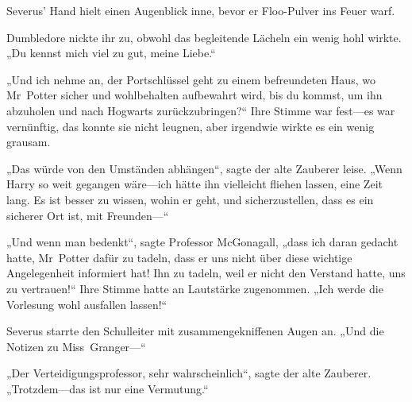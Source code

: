 Severus' Hand hielt einen Augenblick inne, bevor er Floo-Pulver ins Feuer warf.

Dumbledore nickte ihr zu, obwohl das begleitende Lächeln ein wenig hohl wirkte. „Du kennst mich viel zu gut, meine Liebe.“

„Und ich nehme an, der Portschlüssel geht zu einem befreundeten Haus, wo Mr~Potter sicher und wohlbehalten aufbewahrt wird, bis du kommst, um ihn abzuholen und nach Hogwarts zurückzubringen?“
Ihre Stimme war fest—es war vernünftig, das konnte sie nicht leugnen, aber irgendwie wirkte es ein wenig grausam.

„Das würde von den Umständen abhängen“, sagte der alte Zauberer leise. „Wenn Harry so weit gegangen wäre—ich hätte ihn vielleicht fliehen lassen, eine Zeit lang. Es ist besser zu wissen, wohin er geht, und sicherzustellen, dass es ein sicherer Ort ist, mit Freunden—“

„Und wenn man bedenkt“, sagte Professor McGonagall, „dass ich daran gedacht hatte, Mr~Potter dafür zu tadeln, dass er uns nicht über diese wichtige Angelegenheit informiert hat! Ihn zu tadeln, weil er nicht den Verstand hatte, uns zu vertrauen!“
Ihre Stimme hatte an Lautstärke zugenommen.
„Ich werde die Vorlesung wohl ausfallen lassen!“

Severus starrte den Schulleiter mit zusammengekniffenen Augen an. „Und die Notizen zu Miss~Granger—“

„Der Verteidigungsprofessor, sehr wahrscheinlich“, sagte der alte Zauberer. „Trotzdem—das ist nur eine Vermutung.“

